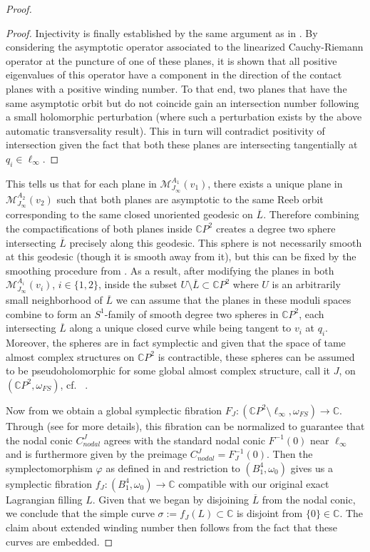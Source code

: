 \documentclass[10pt]{amsart}
\theoremstyle{plain}
\theoremstyle{definition}
\numberwithin{equation}{section}
\newcommand{\C}{\mathbb{C}}
\newcommand{\sse}{\subset}
\newcommand{\sm}{\setminus}
\begin{document}
\begin{proof}
\begin{proof}
    Injectivity is finally established by the same argument as in \cite[Lemma 5.13]{DR16_LagrIsoOfTori}. By considering the asymptotic operator associated to the linearized Cauchy-Riemann operator at the puncture of one of these planes, it is shown that all positive eigenvalues of this operator have a component in the direction of the contact planes with a positive winding number. To that end, two planes that have the same asymptotic orbit but do not coincide gain an intersection number following a small holomorphic perturbation (where such a perturbation exists by the above automatic transversality result). This in turn will contradict positivity of intersection given the fact that both these planes are intersecting tangentially at $q_i\in \ell_\infty$.
\end{proof}

This tells us that for each plane in $\mathcal{M}_{J_\infty}^{A_1}(v_1)$, there exists a unique plane in $\mathcal{M}_{J_\infty}^{A_2}(v_2)$ such that both planes are asymptotic to the same Reeb orbit corresponding to the same closed unoriented geodesic on $\overline{L}$. Therefore combining the compactifications of both planes inside $\C P^2$ creates a degree two sphere intersecting $\overline{L}$ precisely along this geodesic. This sphere is not necessarily smooth at this geodesic (though it is smooth away from it), but this can be fixed by the smoothing procedure from \cite[Section 5.3]{DR16_LagrIsoOfTori}. As a result, after modifying the planes in both $\mathcal{M}_{J_\infty}^{A_i}(v_i)$, $i\in \{1,2\}$, inside the subset $U\sm \overline{L}\sse \C P^2$ where $U$ is an arbitrarily small neighborhood of $\overline{L}$ we can assume that the planes in these moduli spaces combine to form an $S^1$-family of smooth degree two spheres in $\C P^2$, each intersecting $\overline{L}$ along a unique closed curve while being tangent to $v_i$ at $q_i$. Moreover, the spheres are in fact symplectic and given that the space of tame almost complex structures on $\C P^2$ is contractible, these spheres can be assumed to be pseudoholomorphic for some global almost complex structure, call it $J$, on $(\C P^2, \omega_{FS})$, cf. ~\cite[Proposition 5.16]{DR16_LagrIsoOfTori}.

Now from  we obtain a global symplectic fibration $F_J:(\C P^2 \sm \ell_\infty, \omega_{FS})\to \C$. Through \cite[Theorem 4.6]{DR19_WhitneySphere} (see  for more details), this fibration can be normalized to guarantee that the nodal conic $C_{nodal}^J$ agrees with the standard nodal conic $F^{-1}(0)$ near $\ell_\infty$ and is furthermore given by the preimage $C_{nodal}^J=F_J^{-1}(0)$. Then the symplectomorphism $\varphi$ as defined in  and restriction to $(B^4_1, \omega_0)$ gives us a symplectic fibration $f_{J}:(B^4_1, \omega_0)\to \C$ compatible with our original exact Lagrangian filling $L$. Given that we began by disjoining $\overline{L}$ from the nodal conic, we conclude that the simple curve $\sigma:=f_J(L)\sse \C$ is disjoint from $\{0\}\in \C$. The claim about extended winding number then follows from the fact that these curves are embedded.


\end{proof}
\end{document}
